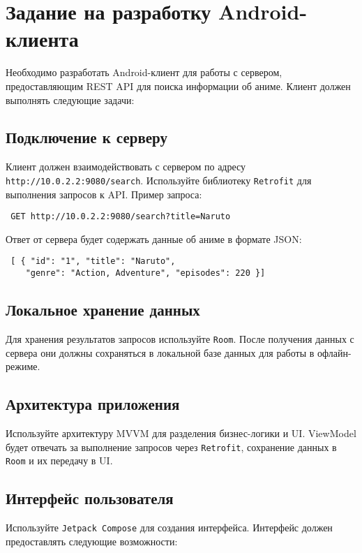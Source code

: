 \section{Задание на разработку Android-клиента}

Необходимо разработать Android-клиент для работы с сервером, предоставляющим REST API для поиска информации об аниме. Клиент должен выполнять следующие задачи:

\subsection{Подключение к серверу} Клиент должен взаимодействовать с сервером по адресу \texttt{http://10.0.2.2:9080/search}. Используйте библиотеку \texttt{Retrofit} для выполнения запросов к API. Пример запроса:

\begin{verbatim} GET http://10.0.2.2:9080/search?title=Naruto \end{verbatim}

Ответ от сервера будет содержать данные об аниме в формате JSON:

\begin{verbatim} [ { "id": "1", "title": "Naruto", 
    "genre": "Action, Adventure", "episodes": 220 }] \end{verbatim}

\subsection{Локальное хранение данных} Для хранения результатов запросов используйте \texttt{Room}. После получения данных с сервера они должны сохраняться в локальной базе данных для работы в офлайн-режиме.

\subsection{Архитектура приложения} Используйте архитектуру MVVM для разделения бизнес-логики и UI. ViewModel будет отвечать за выполнение запросов через \texttt{Retrofit}, сохранение данных в \texttt{Room} и их передачу в UI.

\subsection{Интерфейс пользователя} Используйте \texttt{Jetpack Compose} для создания интерфейса. Интерфейс должен предоставлять следующие возможности:

